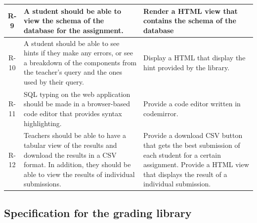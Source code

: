\begin{tabularx}{\textwidth}{|c|Y|Y|}
  R-9 & A student should be able to view the schema of the database for the assignment. & Render a HTML view that contains the schema of the database \\\hline
  R-10 & A  student  should  be  able  to  see  hints  if  they make any  errors, or see a breakdown of the components from the teacher’s query and the ones used by their query. & Display a HTML that display the hint provided by the library. \\\hline
  R-11 & SQL typing on the web application should be made in a browser-based code editor that provides syntax highlighting. & Provide a code editor written in codemirror. \\\hline
  R-12 & Teachers should be able to have a tabular view of the results and download the results in  a CSV format.   In  addition,  they  should  be  able  to  view  the  results  of individual submissions. & Provide a download CSV button that gets the best submission of each student for a certain assignment. Provide a HTML view that displays the result of a individual submission. \\\hline
\end{tabularx}

\subsection{Specification for the grading library}

